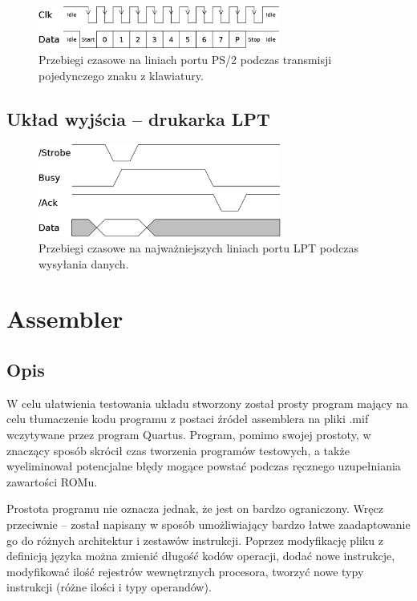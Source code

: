 \documentclass[a4paper,12pt]{report}
\begin{document}
\begin{figure}[h]
\centering
\includegraphics[width=8cm]{./pict/PS2.png}
\caption{Przebiegi czasowe na liniach portu PS/2 podczas transmisji pojedynczego znaku z klawiatury.}
\label{fig:ps2}
\end{figure}

\section{Układ wyjścia -- drukarka LPT}

\begin{figure}[h]
\centering
\includegraphics[width=8cm]{./pict/LPT.png}
\caption{Przebiegi czasowe na najważniejszych liniach portu LPT podczas wysyłania danych.}
\label{fig:lpt}
\end{figure}

\chapter{Assembler}

\section{Opis}

W celu ułatwienia testowania układu stworzony został prosty program mający na celu tłumaczenie kodu programu z postaci źródeł assemblera na pliki .mif wczytywane przez program Quartus. Program, pomimo swojej prostoty, w znaczący sposób skrócił czas tworzenia programów testowych, a także wyeliminował potencjalne błędy mogące powstać podczas ręcznego uzupełniania zawartości ROMu.

Prostota programu nie oznacza jednak, że jest on bardzo ograniczony. Wręcz przeciwnie -- został napisany w sposób umożliwiający bardzo łatwe zaadaptowanie go do różnych architektur i zestawów instrukcji. Poprzez modyfikację pliku z definicją języka można zmienić długość kodów operacji, dodać nowe instrukcje, modyfikować ilość rejestrów wewnętrznych procesora, tworzyć nowe typy instrukcji (różne ilości i typy operandów).
\end{document}
